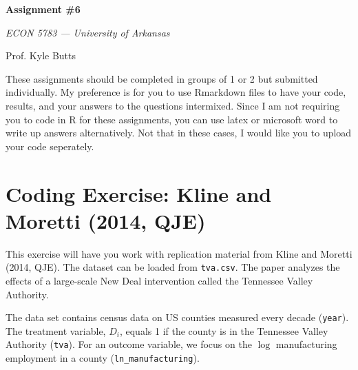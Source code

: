 \documentclass[12pt]{article}
\begin{document}
\begin{center}
  {\Huge\bf Assignment \#6}
  
  \smallskip
  {\large\it  ECON 5783 — University of Arkansas}

  \medskip
  {\large Prof. Kyle Butts}
\end{center}

These assignments should be completed in groups of 1 or 2 but submitted individually. My preference is for you to use Rmarkdown files to have your code, results, and your answers to the questions intermixed. Since I am not requiring you to code in R for these assignments, you can use latex or microsoft word to write up answers alternatively. Not that in these cases, I would like you to upload your code seperately. 

\section*{Coding Exercise: Kline and Moretti (2014, QJE)}

This exercise will have you work with replication material from Kline and Moretti (2014, QJE).
The dataset can be loaded from \texttt{tva.csv}.
The paper analyzes the effects of a large-scale New Deal intervention called the Tennessee Valley Authority. 


The data set contains census data on US counties measured every decade (\texttt{year}). 
The treatment variable, $D_i$, equals 1 if the county is in the Tennessee Valley Authority (\texttt{tva}).
For an outcome variable, we focus on the $\log$ manufacturing employment in a county (\texttt{ln\_manufacturing}).
\end{document}
